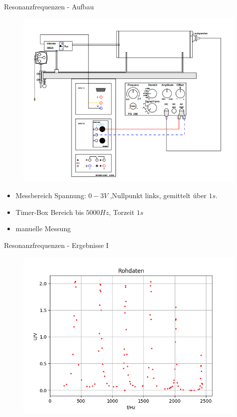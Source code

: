 \documentclass[12pt]{beamer}
\begin{document}
	
	
	
	
	
	
	
	
	\begin{frame}{Resonanzfrequenzen - Aufbau}
	\begin{figure}
	\begin{flushleft}
	\includegraphics[scale=0.35]{aufbau}
	\end{flushleft}
	\end{figure}
	
	\begin{flushright}
	\begin{itemize}
	\item  Messbereich Spannung: $0-3V$ ,Nullpunkt links, gemittelt über $1s$.
	\item Timer-Box Bereich bis $5000Hz$, Torzeit $1s$
	\item manuelle Messung
	\end{itemize}
	\end{flushright}
	\end{frame}
	
	\begin{frame}{Resonanzfrequenzen - Ergebnisse I}
	\begin{figure}
	\includegraphics[scale=0.5]{rohres}
	\end{figure}
	\end{frame}
	
\end{document}
